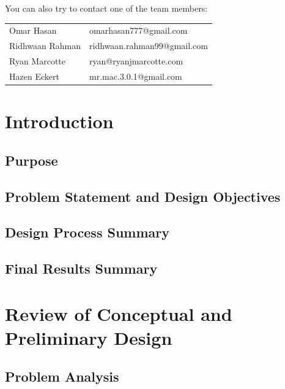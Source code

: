 \documentclass[letterpaper,12pt]{article}
\begin{document}
You can also try to contact one of the team members:\\
\begin{center}
\begin{tabular}{l l}
    Omar Hasan & omarhasan777@gmail.com \\
    Ridhwaan Rahman & ridhwaan.rahman99@gmail.com \\
    Ryan Marcotte & ryan@ryanjmarcotte.com \\
    Hazen Eckert & mr.mac.3.0.1@gmail.com \\
\end{tabular}
\end{center}

\pagebreak
\tableofcontents
\pagebreak

\section{Introduction}
\label{sec:intro}

\subsection{Purpose}
\label{sec:purpose}

\subsection{Problem Statement and Design Objectives}
\label{sec:probstatement}

\subsection{Design Process Summary}
\label{sec:designprocesssummary}

\subsection{Final Results Summary}
\label{sec:resultssummary}

\section{Review of Conceptual and Preliminary Design}
\label{sec:conceptualpreliminarydesign}

\subsection{Problem Analysis}
\label{sec:probanalysis}
\end{document}
